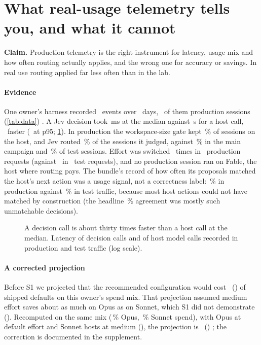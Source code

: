 \section{What real-usage telemetry tells you, and what it cannot}\label{sec:telemetry}

\textbf{Claim.} Production telemetry is the right instrument for latency, usage mix and how often routing actually
applies, and the wrong one for accuracy or savings. In real use routing applied far less often than in the lab.

\paragraph{Evidence} One owner's harness recorded \ObEvents\ events over \ObDays\ days, \ObProdSessions\ of them
production sessions (\cref{tab:data}) \expl. A Jev decision
took \ObJevPfifty\,ms at the median against \ObHostPfifty\,s for a host call, \ObJevHostXFifty\X\ faster
(\ObJevHostXNinetyfive\X\ at p95; \cref{fig:latency}). In production the workspace-size gate kept \ObStScopePct\,\% of
sessions on the host, and Jev routed \ObJevRouteProd\,\% of the sessions it judged, against \AoFableJevRoute\,\% in
the main campaign and \ObJevRouteTest\,\% of test sessions. Effort was switched \ObEffSwitchProd\ times in
\ObEffReqProd\ production requests (against \ObEffSwitchTest\ in \ObEffReqTest\ test requests), and no production
session ran on Fable, the host where routing pays. The bundle's record of how often its proposals matched the host's
next action was a usage signal, not a correctness label: \ObProdRate\,\% in production against \ObTestRate\,\% in test
traffic, because most host actions could not have matched by construction (the headline \ObAllRate\,\% agreement was
mostly such unmatchable decisions).

\begin{figure}[tbp]
\centering
{}\par\smallskip

\caption{A decision call is about thirty times faster than a host call at the median. Latency of decision calls and of
host model calls recorded in production and test traffic (log scale).}
\label{fig:latency}
\end{figure}

\paragraph{A corrected projection} Before S1 we projected that the recommended configuration would cost
\AthreeOld\X\ (\AthreeOldBand) of shipped defaults on this owner's spend mix. That projection assumed medium effort
saves about as much on Opus as on Sonnet, which S1 did not demonstrate (\SHFourRatio\X). Recomputed on the same mix
(\AthreeOpusShare\,\% Opus, \AthreeSonnetShare\,\% Sonnet spend), with Opus at default effort and Sonnet hosts at
medium (\EcRatio\X), the projection is \AthreeNew\X\ (\AthreeNewBand) \expl; the correction is documented in the
supplement.

